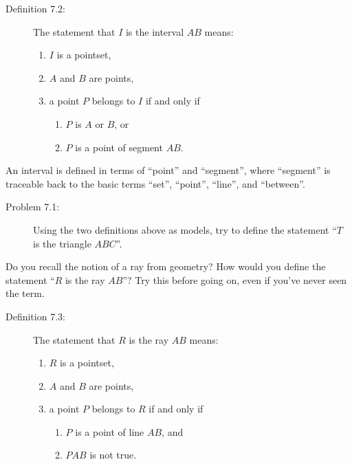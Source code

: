\documentclass[english]{book}
\begin{document}
\begin{description}

\item[Definition 7.2:] The statement that $I$ is the interval $AB$ means:
  \begin{enumerate}[\hspace{1cm}1)]
    \item $I$ is a pointset,
    \item $A$ and $B$ are points,
    \item a point $P$ belongs to $I$ if and only if
    \begin{enumerate}[\hspace{1cm}a)]
      \item $P$ is $A$ or $B$, or
      \item $P$ is a point of segment $AB$.
    \end{enumerate}
  \end{enumerate}

\end{description}

An interval is defined in terms of ``point'' and ``segment'', where ``segment'' is traceable back to the basic terms ``set'', ``point'', ``line'', and ``between''.

\begin{description}

\item[Problem 7.1:] Using the two definitions above as models, try to define the statement ``$T$ is the triangle $ABC$''.

\end{description}

Do you recall the notion of a ray from geometry? How would you define the statement ``$R$ is the ray $AB$''? Try this before going on, even if you've never seen the term.

\begin{description}

\item[Definition 7.3:] The statement that $R$ is the ray $AB$ means:
  \begin{enumerate}[\hspace{1cm}1)]
    \item $R$ is a pointset,
    \item $A$ and $B$ are points,
    \item a point $P$ belongs to $R$ if and only if
    \begin{enumerate}[\hspace{1cm}a)]
      \item $P$ is a point of line $AB$, and
      \item $PAB$ is not true.
    \end{enumerate}
  \end{enumerate}

\end{description}
\end{document}
